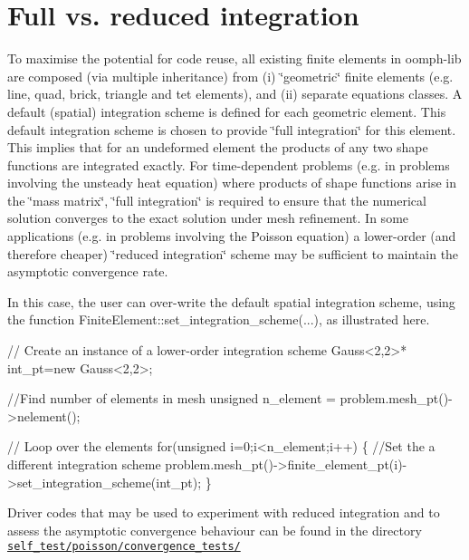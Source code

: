 \hypertarget{index_full_integration}{}\section{Full vs. reduced integration}\label{index_full_integration}
To maximise the potential for code reuse, all existing finite elements in {\ttfamily oomph-\/lib} are composed (via multiple inheritance) from (i) \char`\"{}geometric\char`\"{} finite elements (e.\+g. line, quad, brick, triangle and tet elements), and (ii) separate equations classes. A default (spatial) integration scheme is defined for each geometric element. This default integration scheme is chosen to provide \char`\"{}full integration\char`\"{} for this element. This implies that for an undeformed element the products of any two shape functions are integrated exactly. For time-\/dependent problems (e.\+g. in problems involving the unsteady heat equation) where products of shape functions arise in the \char`\"{}mass matrix\char`\"{}, \char`\"{}full integration\char`\"{} is required to ensure that the numerical solution converges to the exact solution under mesh refinement. In some applications (e.\+g. in problems involving the Poisson equation) a lower-\/order (and therefore cheaper) \char`\"{}reduced integration\char`\"{} scheme may be sufficient to maintain the asymptotic convergence rate.

In this case, the user can over-\/write the default spatial integration scheme, using the function {\ttfamily Finite\+Element\+::set\+\_\+integration\+\_\+scheme}(...), as illustrated here. 
\begin{DoxyCode}
 \textcolor{comment}{// Create an instance of a lower-order integration scheme}
 Gauss<2,2>* int\_pt=\textcolor{keyword}{new} Gauss<2,2>;

\textcolor{comment}{//Find number of elements in mesh}
\textcolor{keywordtype}{unsigned} n\_element = problem.mesh\_pt()->nelement();

\textcolor{comment}{// Loop over the elements }
\textcolor{keywordflow}{for}(\textcolor{keywordtype}{unsigned} i=0;i<n\_element;i++)
 \{
  \textcolor{comment}{//Set the a different integration scheme}
  problem.mesh\_pt()->finite\_element\_pt(i)->set\_integration\_scheme(int\_pt); 
 \}
\end{DoxyCode}


Driver codes that may be used to experiment with reduced integration and to assess the asymptotic convergence behaviour can be found in the directory \href{../../../self_test/poisson/convergence_tests}{\tt self\+\_\+test/poisson/convergence\+\_\+tests/} 

